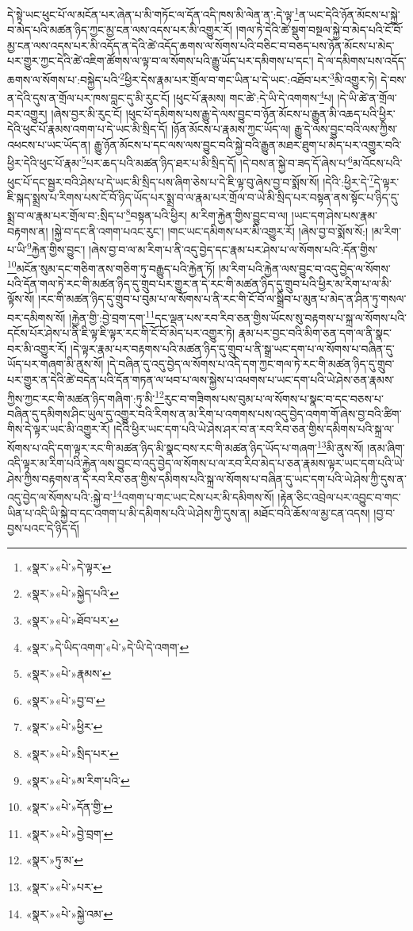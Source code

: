 དེ་སྟེ་ཡང་ཕུང་པོ་ལ་མངོན་པར་ཞེན་པ་མི་གཏོང་ལ་དོན་འདི་ཁས་མི་ལེན་ན་:དེ་ལྟ་\footnote{«སྣར་»«པེ་»དེ་ལྟར་}ན་ཡང་དེའི་ཉོན་མོངས་པ་སྐྱེ་བ་མེད་པའི་མཚན་ཉིད་ཀྱང་མྱ་ངན་ལས་འདས་པར་མི་འགྱུར་རོ། །གལ་ཏེ་དེའི་ཚེ་སྡུག་བསྔལ་སྐྱེ་བ་མེད་པའི་ངོ་བོ་མྱ་ངན་ལས་འདས་པར་མི་འདོད་ན་དེའི་ཚེ་འདོད་ཆགས་ལ་སོགས་པའི་བཅིང་བ་བཅད་པས་ཉོན་མོངས་པ་མེད་པར་གྱུར་ཀྱང་དེའི་ཚེ་འཇིག་ཚོགས་ལ་ལྟ་བ་ལ་སོགས་པའི་རྒྱུ་ཡོད་པར་དམིགས་པ་དང་། དེ་ལ་དམིགས་པས་འདོད་ཆགས་ལ་སོགས་པ་:བསྐྱེད་པའི་\footnote{«སྣར་»«པེ་»སྐྱེད་པའི་}ཕྱིར་དེས་རྣམ་པར་གྲོལ་བ་གང་ཡིན་པ་དེ་ཡང་:འཐོབ་པར་\footnote{«སྣར་»«པེ་»ཐོབ་པར་}མི་འགྱུར་ཏེ། དེ་བས་ན་དེའི་དུས་ན་གྲོལ་པར་ཁས་བླང་དུ་མི་རུང་ངོ། །ཕུང་པོ་རྣམས། གང་ཚེ་:དེ་ཡི་དེ་འགགས་\footnote{«སྣར་»དེ་ཡིད་འགག་«པེ་»དེ་ཡི་དེ་འགག་}པ། །དེ་ཡི་ཚེ་ན་གྲོལ་བར་འགྱུར། །ཞེས་བྱར་མི་རུང་ངོ། །ཕུང་པོ་དམིགས་པས་རྒྱུ་དེ་ལས་བྱུང་བ་ཉོན་མོངས་པ་རྒྱུན་མི་འཆད་པའི་ཕྱིར་དེའི་ཕུང་པོ་རྣམས་འགག་པ་དེ་ཡང་མི་སྲིད་དོ། །ཉོན་མོངས་པ་རྣམས་ཀྱང་ཡོད་ལ། རྒྱུ་དེ་ལས་བྱུང་བའི་ལས་ཀྱིས་འཕངས་པ་ཡང་ཡོད་ན། རྒྱུ་ཉོན་མོངས་པ་དང་ལས་ལས་བྱུང་བའི་སྐྱེ་བའི་རྒྱུན་མཐར་ཐུག་པ་མེད་པར་འགྱུར་བའི་ཕྱིར་དེའི་ཕུང་པོ་རྣམ་\footnote{«སྣར་»«པེ་»རྣམས་}པར་ཆད་པའི་མཚན་ཉིད་ཐར་པ་མི་སྲིད་དོ། །དེ་བས་ན་སྐྱེ་བ་ཟད་དོ་ཞེས་པ་\footnote{«སྣར་»«པེ་»བྱ་བ་}མ་འོངས་པའི་ཕུང་པོ་དང་སྦྱར་བའི་ཤེས་པ་དེ་ཡང་མི་སྲིད་པས་ཞིག་ཅེས་པ་དེ་ཇི་ལྟ་བུ་ཞེས་བྱ་བ་སྨོས་སོ། །དེའི་:ཕྱིར་དེ་\footnote{«སྣར་»«པེ་»ཕྱིར་}དེ་ལྟར་ཇི་སྐད་སྨྲས་པ་རིགས་པས་ངོ་བོ་ཉིད་ཡོད་པར་སྨྲ་བ་ལ་རྣམ་པར་གྲོལ་བ་ཡེ་མི་སྲིད་པར་བསྟན་ནས་སྟོང་པ་ཉིད་དུ་སྨྲ་བ་ལ་རྣམ་པར་གྲོལ་བ་:སྲིད་པ་\footnote{«སྣར་»«པེ་»སྲིད་པར་}བསྟན་པའི་ཕྱིར། མ་རིག་རྐྱེན་གྱིས་བྱུང་བ་ལ། །ཡང་དག་ཤེས་པས་རྣམ་བརྟགས་ན། །སྐྱེ་བ་དང་ནི་འགག་པའང་རུང་། །གང་ཡང་དམིགས་པར་མི་འགྱུར་རོ། །ཞེས་བྱ་བ་སྨོས་སོ:། །མ་རིག་པ་ཡི་\footnote{«སྣར་»«པེ་»མ་རིག་པའི་}རྐྱེན་གྱིས་བྱུང་། །ཞེས་བྱ་བ་ལ་མ་རིག་པ་ནི་འདུ་བྱེད་དང་རྣམ་པར་ཤེས་པ་ལ་སོགས་པའི་:དོན་གྱིས་\footnote{«སྣར་»«པེ་»དོན་གྱི་}མངོན་སུམ་དང་གཅིག་ནས་གཅིག་ཏུ་བརྒྱུད་པའི་རྐྱེན་ཏོ། །མ་རིག་པའི་རྐྱེན་ལས་བྱུང་བ་འདུ་བྱེད་ལ་སོགས་པའི་དོན་གལ་ཏེ་རང་གི་མཚན་ཉིད་དུ་གྲུབ་པར་གྱུར་ན་དེ་རང་གི་མཚན་ཉིད་དུ་གྲུབ་པའི་ཕྱིར་མ་རིག་པ་ལ་མི་ལྟོས་སོ། །རང་གི་མཚན་ཉིད་དུ་གྲུབ་པ་བུམ་པ་ལ་སོགས་པ་ནི་རང་གི་ངོ་བོ་ལ་སྒྲིབ་པ་མུན་པ་མེད་ན་ཤིན་ཏུ་གསལ་བར་དམིགས་སོ། །རྐྱེན་གྱི་:བྱེ་བྲག་དག་\footnote{«སྣར་»«པེ་»བྱེ་བྲག་}དང་ལྡན་པས་རབ་རིབ་ཅན་གྱིས་ཡོངས་སུ་བརྟགས་པ་སྐྲ་ལ་སོགས་པའི་དངོས་པོར་ཤེས་པ་ནི་ཇི་ལྟ་ཇི་ལྟར་རང་གི་ངོ་བོ་མེད་པར་འགྱུར་ཏེ། རྣམ་པར་བྱང་བའི་མིག་ཅན་དག་ལ་ནི་སྣང་བར་མི་འགྱུར་རོ། །དེ་ལྟར་རྣམ་པར་བརྟགས་པའི་མཚན་ཉིད་དུ་གྲུབ་པ་ནི་སྒྲ་ཡང་དག་པ་ལ་སོགས་པ་བཞིན་དུ་ཡོད་པར་གཞག་མི་ནུས་སོ། །དེ་བཞིན་དུ་འདུ་བྱེད་ལ་སོགས་པ་འདི་དག་ཀྱང་གལ་ཏེ་རང་གི་མཚན་ཉིད་དུ་གྲུབ་པར་གྱུར་ན་དེའི་ཚེ་བདེན་པའི་དོན་གཏན་ལ་ཕབ་པ་ལས་སྐྱེས་པ་འཕགས་པ་ཡང་དག་པའི་ཡེ་ཤེས་ཅན་རྣམས་ཀྱིས་ཀྱང་རང་གི་མཚན་ཉིད་གཞིག་:ཏུ་མི་\footnote{«སྣར་»ཏུ་མ་}རུང་བ་གཟིགས་པས་བུམ་པ་ལ་སོགས་པ་སྣང་བ་དང་བཅས་པ་བཞིན་དུ་དམིགས་ཤིང་ཡུལ་དུ་འགྱུར་བའི་རིགས་ན་མ་རིག་པ་འགགས་པས་འདུ་བྱེད་འགག་གོ་ཞེས་བྱ་བའི་ཚིག་གིས་དེ་ལྟར་ཡང་མི་འགྱུར་རོ། །དེའི་ཕྱིར་ཡང་དག་པའི་ཡེ་ཤེས་ཤར་བ་ན་རབ་རིབ་ཅན་གྱིས་དམིགས་པའི་སྐྲ་ལ་སོགས་པ་འདི་དག་ལྟར་རང་གི་མཚན་ཉིད་མི་སྣང་བས་རང་གི་མཚན་ཉིད་ཡོད་པ་གཞག་\footnote{«སྣར་»«པེ་»པར་}མི་ནུས་སོ། །ནམ་ཞིག་འདི་ལྟར་མ་རིག་པའི་རྐྱེན་ལས་བྱུང་བ་འདུ་བྱེད་ལ་སོགས་པ་ལ་རབ་རིབ་མེད་པ་ཅན་རྣམས་ལྟར་ཡང་དག་པའི་ཡེ་ཤེས་ཀྱིས་བརྟགས་ན་དེ་རབ་རིབ་ཅན་གྱིས་དམིགས་པའི་སྐྲ་ལ་སོགས་པ་བཞིན་དུ་ཡང་དག་པའི་ཡེ་ཤེས་ཀྱི་དུས་ན་འདུ་བྱེད་ལ་སོགས་པའི་:སྐྱེ་བ་\footnote{«སྣར་»«པེ་»སྐྱེ་འམ་}འགག་པ་གང་ཡང་ངེས་པར་མི་དམིགས་སོ། །རྟེན་ཅིང་འབྲེལ་པར་འབྱུང་བ་གང་ཡིན་པ་འདི་ཡི་སྐྱེ་བ་དང་འགག་པ་མི་དམིགས་པའི་ཡེ་ཤེས་ཀྱི་དུས་ན། མཐོང་བའི་ཆོས་ལ་མྱ་ངན་འདས། །བྱ་བ་བྱས་པའང་དེ་ཉིད་དོ། 
